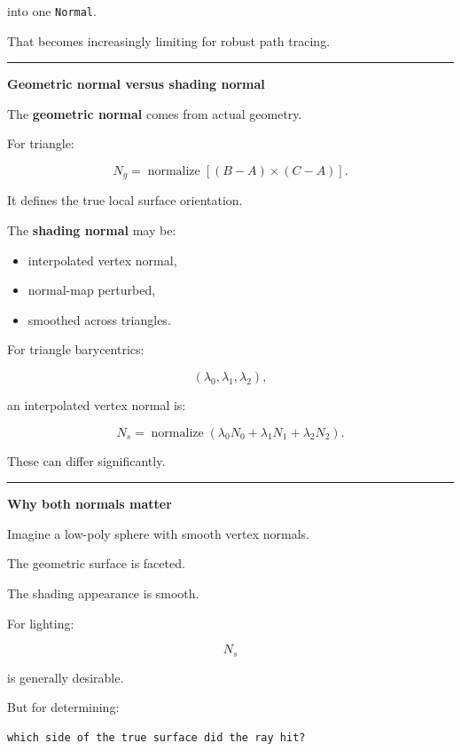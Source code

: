 into one \texttt{Normal}.

That becomes increasingly limiting for robust path tracing.

\begin{center}\rule{0.5\linewidth}{0.5pt}\end{center}

\textbf{Geometric normal versus shading normal}

The \textbf{geometric normal} comes from actual geometry.

For triangle:

\[
\boxed{
N_g
=
\operatorname{normalize}
[
(B-A)\times(C-A)
].
}
\]

It defines the true local surface orientation.

The \textbf{shading normal} may be:

\begin{itemize}
\tightlist
\item
  interpolated vertex normal,
\item
  normal-map perturbed,
\item
  smoothed across triangles.
\end{itemize}

For triangle barycentrics:

\[
(\lambda_0,\lambda_1,\lambda_2),
\]

an interpolated vertex normal is:

\[
\boxed{
N_s=
\operatorname{normalize}
(
\lambda_0N_0+
\lambda_1N_1+
\lambda_2N_2
).
}
\]

These can differ significantly.

\begin{center}\rule{0.5\linewidth}{0.5pt}\end{center}

\textbf{Why both normals matter}

Imagine a low-poly sphere with smooth vertex normals.

The geometric surface is faceted.

The shading appearance is smooth.

For lighting:

\[
N_s
\]

is generally desirable.

But for determining:

\begin{verbatim}
which side of the true surface did the ray hit?
\end{verbatim}

